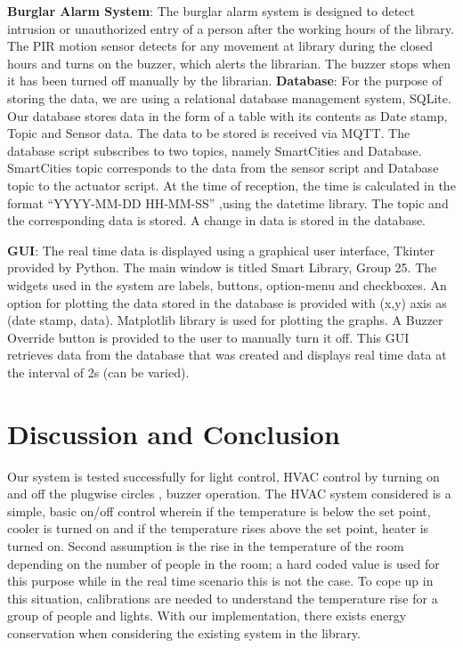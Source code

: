 \documentclass[runningheads]{llncs}
\begin{document}
\textbf{Burglar Alarm System}:
	The burglar alarm system is designed to detect intrusion or unauthorized entry of a person after the working hours of the library. The PIR motion sensor detects for any movement at library during the closed hours and turns on the buzzer, which alerts the librarian. The buzzer stops when it has been turned off manually by the librarian.
\vspace{2mm}
\newline\textbf{Database}:
	For the purpose of storing the data, we are using a relational database management system, SQLite. Our database stores data in the form of a table with its contents as Date stamp, Topic and Sensor data. The data to be stored is received via MQTT. The database script subscribes to two topics, namely SmartCities and Database. SmartCities topic corresponds to the data from the sensor script and Database topic to the actuator script. At the time of reception, the time is calculated in the format “YYYY-MM-DD HH-MM-SS” ,using the datetime library. The topic and the corresponding data is stored. A change in data is stored in the database.

\vspace{3mm}
\textbf{GUI}:
The real time data is displayed using a graphical user interface, Tkinter provided by Python. The main window is titled Smart Library, Group 25. The widgets used in the system are labels, buttons, option-menu and checkboxes. An option for plotting the data stored in the database is provided with (x,y) axis as (date stamp, data). Matplotlib library is used for plotting the graphs. A Buzzer Override button is provided to the user to manually turn it off. This GUI retrieves data from the database that was created and displays real time data at the interval of 2s (can be varied).


\section{Discussion and Conclusion}
Our system is tested successfully for light control, HVAC control by turning on and off the plugwise circles , buzzer operation. The HVAC system considered is a simple, basic on/off control wherein if the temperature is below the set point, cooler is turned on and if the temperature rises above the set point, heater is turned on. Second assumption is the rise in the temperature of the room depending on the number of people in the room; a hard coded value is used for this purpose while in the real time scenario this is not the case. To cope up in this situation, calibrations are needed to understand the temperature rise for a group of people and lights. With our implementation, there exists energy conservation when considering the existing system in the library.

%
%


\end{document}
